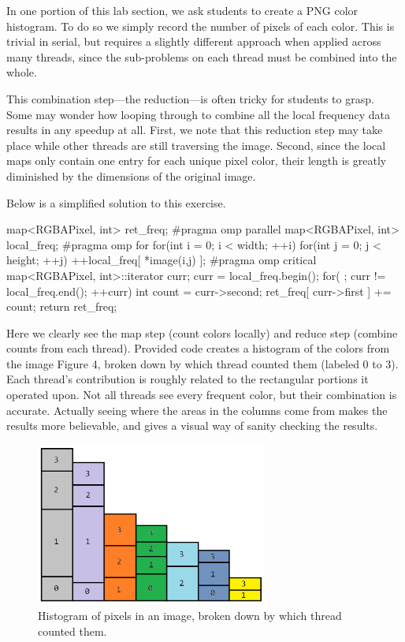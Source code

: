 \documentclass[conference]{./IEEEtran}
\begin{document}
In one portion of this lab section, we ask students to create a PNG color
histogram. To do so we simply record the number of pixels of each color. This is
trivial in serial, but requires a slightly different approach when applied
across many threads, since the sub-problems on each thread must be combined into
the whole.

This combination step---the reduction---is often tricky for students to grasp.
Some may wonder how looping through to combine all the local frequency data
results in any speedup at all. First, we note that this reduction step may take
place while other threads are still traversing the image. Second, since the
local maps only contain one entry for each unique pixel color, their length is
greatly diminished by the dimensions of the original image.

Below is a simplified solution to this exercise. \\

\begin{cppcode}
map<RGBAPixel, int> ret_freq;
#pragma omp parallel
{
   map<RGBAPixel, int> local_freq;
#pragma omp for
   for(int i = 0; i < width; ++i)
   {
      for(int j = 0; j < height; ++j)
          ++local_freq[ *image(i,j) ];
   }
#pragma omp critical
   {
      map<RGBAPixel, int>::iterator curr;
      curr = local_freq.begin();
      for( ; curr != local_freq.end(); ++curr)
      {
         int count = curr->second;
         ret_freq[ curr->first ] += count;
      }
   }
}
return ret_freq;
\end{cppcode}

Here we clearly see the map step (count colors locally) and reduce step (combine
counts from each thread). Provided code creates a histogram of the colors from
the image Figure 4, broken down by which thread counted them
(labeled 0 to 3).  Each thread's contribution is roughly related to the
rectangular portions it operated upon.  Not all threads see every frequent
color, but their combination is accurate. Actually seeing where the areas in the
columns come from makes the results more believable, and gives a visual way
of sanity checking the results.

\begin{figure}[here]
\label{fig:chart}
\begin{center}
\includegraphics[width=3.0in]{chart.png}
\caption{Histogram of pixels in an image, broken down by which thread counted
them.}
\end{center}
\end{figure}
\end{document}
